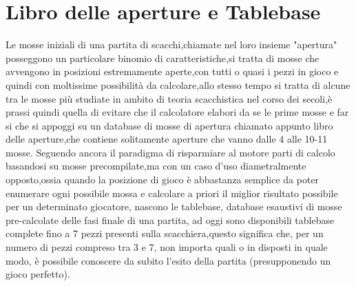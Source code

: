 \section {Libro delle aperture e Tablebase}
Le mosse iniziali di una partita di scacchi,chiamate nel loro insieme "apertura" posseggono un particolare binomio di caratteristiche,si tratta di mosse che avvengono in posizioni estremamente aperte,con tutti o quasi i pezzi
in gioco e quindi con moltissime possibilità da calcolare,allo stesso tempo si tratta di alcune tra le mosse più studiate in ambito di teoria scacchistica nel corso dei secoli,è prassi quindi quella di evitare che
il calcolatore elabori da se le prime mosse e far si che si appoggi su un database di mosse di apertura chiamato appunto libro delle aperture,che contiene solitamente aperture che vanno dalle 4 alle 10-11 mosse.
Seguendo ancora il paradigma di risparmiare al motore parti di calcolo basandosi su mosse precompilate,ma con un caso d'uso diametralmente opposto,ossia quando la posizione di gioco è abbastanza semplice
da poter enumerare ogni possibile mossa e calcolare a priori il miglior risultato possibile per un determinato giocatore, nascono le tablebase, database esaustivi di mosse pre-calcolate delle fasi finale di una 
partita, ad oggi sono disponibili tablebase complete fino a 7 pezzi presenti sulla scacchiera,questo significa che, per un numero di pezzi compreso tra 3 e 7, non importa quali o in disposti in quale modo,
è possibile conoscere da subito l'esito della partita (presupponendo un gioco perfetto).
